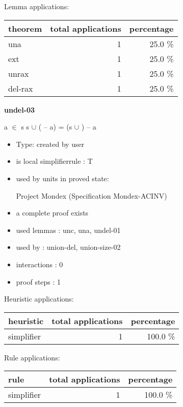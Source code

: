 \documentclass[a4paper]{article}
\begin{document}
Lemma applications:

\begin{supertabular}{l|r|r}
theorem	        & total applications & percentage \\ \hline
una & 1 & 25.0 \% \\
ext & 1 & 25.0 \% \\
unrax & 1 & 25.0 \% \\
del-rax & 1 & 25.0 \% \\

\end{supertabular}
\pagebreak

{\LARGE\bf undel-03}\label{lemma-undel-03}

\medskip

 \Fol \Not a $\in$ s \Imp s $\cup$ ( -- a) = (s $\cup$ ) -- a

\begin{itemize}

\item Type: created by user

\item is local simplifierrule : T
\item used by units in proved state:

Project Mondex (Specification Mondex-ACINV)
\item       a complete proof exists
\item       used lemmas  : unc, una, undel-01
\item       used by      : union-del, union-size-02
\item       interactions : 0
\item       proof steps  : 1
\end{itemize}

\medskip


Heuristic applications:

\begin{supertabular}{l|r|r}
heuristic	& total applications & percentage \\ \hline
simplifier & 1 & 100.0 \% \\

\end{supertabular}

Rule applications:

\begin{supertabular}{l|r|r}
rule	        & total applications & percentage \\ \hline
simplifier & 1 & 100.0 \% \\

\end{supertabular}
\end{document}
